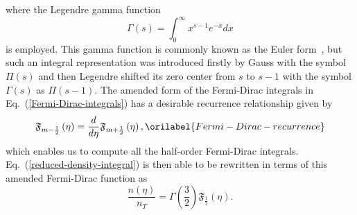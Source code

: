 \documentclass[aps,showkeys,noshowpacs,superscriptaddress,pre,preprint]{revtex4-2}
\let\label\orilabel
\begin{document}
where the Legendre gamma function~\cite{Edwards2001}
\begin{equation*}
\Gamma\left( s \right) = \int_0^\infty x^{s - 1} e^{-x} dx 
\end{equation*}  
is employed.
This gamma function is commonly known as the Euler form~\cite{Arfken-Weber1995},
but such an integral representation was introduced firstly by Gauss with the symbol $\Pi \left( s \right)$
and then Legendre shifted its zero center from $s$ to $s-1$ 
with the symbol $\Gamma \left( s \right)$ as $\Pi \left( s - 1 \right)$.
The amended form of the Fermi-Dirac integrals in Eq.~(\ref{Fermi-Dirac-integrals}) 
has a desirable recurrence relationship given by
\begin{equation}
\mathfrak{F}_{m - \frac{1}{2}} \left( \eta \right) = \frac{d}{d\eta} \mathfrak{F}_{m + \frac{1}{2}} \left( \eta \right) ,
\label{Fermi-Dirac-recurrence}
\end{equation}
which enables us to compute all the half-order Fermi-Dirac integrals.
Eq.~(\ref{reduced-density-integral}) is then able to be rewritten in terms of this amended Fermi-Dirac function as
\begin{equation}
\frac{n \left( \eta \right)}{n_T} = {\Gamma \left( \frac{3}{2} \right)} \mathfrak{F}_{\frac{1}{2}} \left( \eta \right) .
\end{equation}
\end{document}
